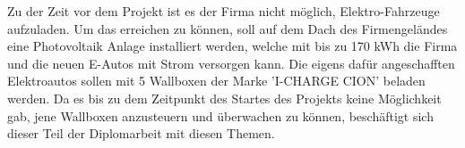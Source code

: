 Zu der Zeit vor dem Projekt ist es der Firma nicht möglich, Elektro-Fahrzeuge aufzuladen. Um das erreichen zu können, soll auf dem Dach des Firmengeländes eine Photovoltaik Anlage installiert werden, welche mit bis zu 170 kWh die Firma und die neuen E-Autos mit Strom versorgen kann. Die eigens dafür angeschafften Elektroautos sollen mit 5 Wallboxen der Marke 'I-CHARGE CION' beladen werden. Da es bis zu dem Zeitpunkt des Startes des Projekts keine Möglichkeit gab, jene Wallboxen anzusteuern und überwachen zu können, beschäftigt sich dieser Teil der Diplomarbeit mit diesen Themen. 
